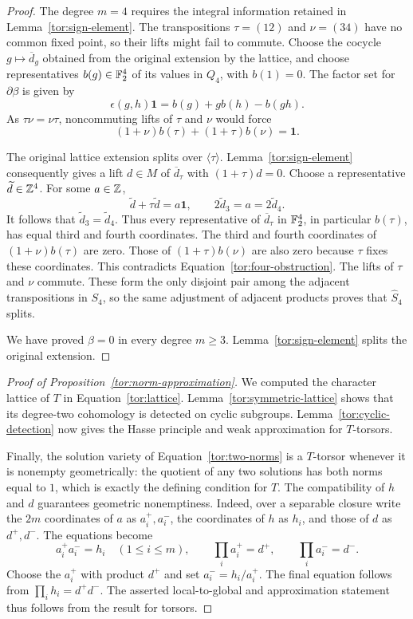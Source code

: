 \begin{proof}
The degree $m=4$ requires the integral information retained in
Lemma~\ref{tor:sign-element}.  The transpositions
$\tau=(12)$ and $\nu=(34)$ have no common fixed point, so their
lifts might fail to commute.  Choose the cocycle
$g\mapsto\overline d_g$ obtained from the original extension by
the lattice, and choose representatives $b(g)\in\mathbb F_2^4$ of its
values in $Q_4$, with $b(1)=0$.  The factor set for
$\partial\beta$ is given by
\[
       \epsilon(g,h)\mathbf1=b(g)+g b(h)-b(gh).
\]
As $\tau\nu=\nu\tau$, noncommuting lifts of $\tau$ and $\nu$
would force
\begin{equation}\label{tor:four-obstruction}
          (1+\nu)b(\tau)+(1+\tau)b(\nu)=\mathbf1.
\end{equation}

The original lattice extension splits over $\langle\tau\rangle$.
Lemma~\ref{tor:sign-element} consequently gives a lift $d\in M$
of $\overline d_\tau$ with $(1+\tau)d=0$.
Choose a representative $\widetilde d\in\mathbb Z^4$.  For some
$a\in\mathbb Z$,
\[
       \widetilde d+\tau\widetilde d=a\mathbf1,
       \qquad 2\widetilde d_3=a=2\widetilde d_4.
\]
It follows that $\widetilde d_3=\widetilde d_4$.  Thus every
representative of $\overline d_\tau$ in $\mathbb F_2^4$, in particular
$b(\tau)$, has equal third and fourth coordinates.  The third and
fourth coordinates of $(1+\nu)b(\tau)$ are zero.  Those of
$(1+\tau)b(\nu)$ are also zero because $\tau$ fixes these
coordinates.  This contradicts Equation~\eqref{tor:four-obstruction}.
The lifts of $\tau$ and $\nu$ commute.  These form the only disjoint
pair among the adjacent transpositions in $S_4$, so the same adjustment of adjacent
products proves that $\widehat S_4$ splits.

We have proved $\beta=0$ in every degree $m\geq3$.
Lemma~\ref{tor:sign-element} splits the original extension.
\end{proof}

\begin{proof}[Proof of Proposition~\ref{tor:norm-approximation}]
We computed the character lattice of $T$ in Equation~\eqref{tor:lattice}.
Lemma~\ref{tor:symmetric-lattice} shows that its degree-two
cohomology is detected on cyclic subgroups.
Lemma~\ref{tor:cyclic-detection} now gives the Hasse principle and
weak approximation for $T$-torsors.

Finally, the solution variety of Equation~\eqref{tor:two-norms}
is a $T$-torsor whenever it is nonempty geometrically: the quotient
of any two solutions has both norms equal to $1$, which is exactly
the defining condition for $T$.
The compatibility of $h$ and $d$ guarantees geometric nonemptiness.
Indeed, over a separable closure write the $2m$ coordinates of $a$
as $a_i^+,a_i^-$, the coordinates of $h$ as $h_i$, and those of
$d$ as $d^+,d^-$.  The equations become
\[
 a_i^+a_i^-=h_i\quad(1\leq i\leq m),\qquad
 \prod_i a_i^+=d^+,\qquad \prod_i a_i^-=d^-.
\]
Choose the $a_i^+$ with product $d^+$ and set
$a_i^-=h_i/a_i^+$.  The final equation follows from
$\prod_i h_i=d^+d^-$.
The asserted local-to-global and approximation statement thus
follows from the result for torsors.
\end{proof}
